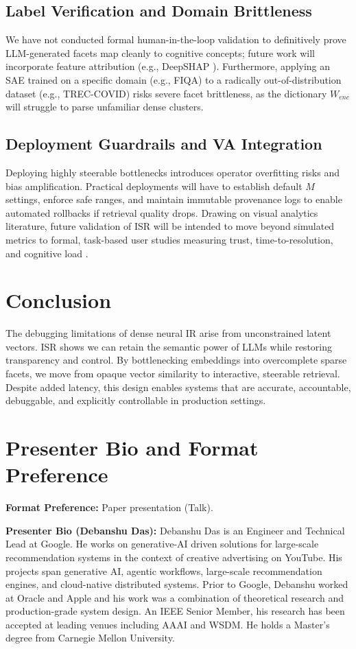 \documentclass[sigconf,authordraft]{acmart}
\begin{document}
\subsection{Label Verification and Domain Brittleness}  
We have not conducted formal human-in-the-loop validation to definitively prove LLM-generated facets map cleanly to cognitive concepts; future work will incorporate feature attribution (e.g., DeepSHAP \cite{fernando2019}). Furthermore, applying an SAE trained on a specific domain (e.g., FIQA) to a radically out-of-distribution dataset (e.g., TREC-COVID) risks severe facet brittleness, as the dictionary $W_{enc}$ will struggle to parse unfamiliar dense clusters.

\subsection{Deployment Guardrails and VA Integration} 
Deploying highly steerable bottlenecks introduces operator overfitting risks and bias amplification. Practical deployments will have to establish default $M$ settings, enforce safe ranges, and maintain immutable provenance logs to enable automated rollbacks if retrieval quality drops. Drawing on visual analytics literature, future validation of ISR will be intended to move beyond simulated metrics to formal, task-based user studies measuring trust, time-to-resolution, and cognitive load \cite{endert2018}.

\section{Conclusion}
The debugging limitations of dense neural IR arise from unconstrained latent vectors. ISR shows we can retain the semantic power of LLMs while restoring transparency and control. By bottlenecking embeddings into overcomplete sparse facets, we move from opaque vector similarity to interactive, steerable retrieval. Despite added latency, this design enables systems that are accurate, accountable, debuggable, and explicitly controllable in production settings.

\section*{Presenter Bio and Format Preference}
\textbf{Format Preference:} Paper presentation (Talk).

\textbf{Presenter Bio (Debanshu Das):} Debanshu Das is an Engineer and Technical Lead at Google. He works on generative-AI driven solutions for large-scale recommendation systems in the context of creative advertising on YouTube. His projects span generative AI, agentic workflows, large-scale recommendation engines, and cloud-native distributed systems. Prior to Google, Debanshu worked at Oracle and Apple and his work was a combination of theoretical research and production-grade system design. An IEEE Senior Member, his research has been accepted at leading venues including AAAI and WSDM. He holds a Master’s degree from Carnegie Mellon University.
\end{document}
